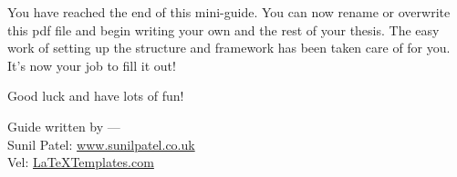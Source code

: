 You have reached the end of this mini-guide. You can now rename or overwrite this pdf file and begin writing your own  and the rest of your thesis. The easy work of setting up the structure and framework has been taken care of for you. It's now your job to fill it out!

Good luck and have lots of fun!

\begin{flushright}
Guide written by ---\\
Sunil Patel: \href{http://www.sunilpatel.co.uk}{www.sunilpatel.co.uk}\\
Vel: \href{http://www.LaTeXTemplates.com}{LaTeXTemplates.com}
\end{flushright}
